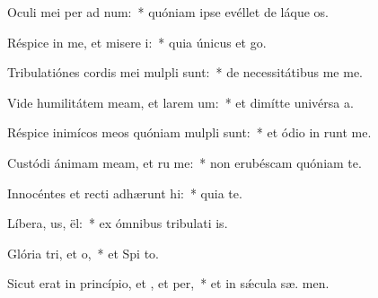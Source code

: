 \item Oculi mei per ad num:~* quóniam ipse evéllet de láque  os.
\item Réspice in me, et misere i:~* quia únicus et   go.
\item Tribulatiónes cordis mei mulpli sunt:~* de necessitátibus me  me.
\item Vide humilitátem meam, et larem um:~* et dimítte univérsa  a.
\item Réspice inimícos meos quóniam mulpli sunt:~* et ódio in runt me.
\item Custódi ánimam meam, et ru me:~* non erubéscam quóniam   te.
\item Innocéntes et recti adhærunt hi:~* quia  te.
\item Líbera, us, ël:~* ex ómnibus tribulati is.
\item Glória tri, et o,~* et Spi to.
\item Sicut erat in princípio, et , et per,~* et in sǽcula sæ. men.
